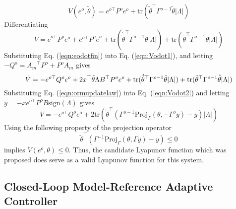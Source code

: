 \documentclass[]{../sty/aiaa-tc}
\begin{document}
  \begin{equation}
    V(e^{o},\tilde{\theta})=e^{o\top}P^{o}e^{o}+\text{tr}\left(\tilde{\theta}^{\top}\Gamma^{o-1}\tilde{\theta}|\Lambda|\right)
  \end{equation}
  Differentiating
  \begin{equation}
    \label{eqn:Vodot1}
    \dot{V}={\dot{e}}^{o\top}P^{o}e^{o}+e^{o\top}P^{o}\dot{e}^{o}+
    \text{tr}(\dot{\tilde{\theta}}^{\top}\Gamma^{o-1}\tilde{\theta}|\Lambda|)
    +\text{tr}({\tilde{\theta}}^{\top}\Gamma^{o-1}\dot{\tilde{\theta}}|\Lambda|)
  \end{equation}
  Substituting Eq. (\ref{eqn:eodotfin}) into Eq. (\ref{eqn:Vodot1}), and letting $-Q^{o}={A_{m}}^{\top}P^{o}+P^{o}A_{m}$ gives
  \begin{equation}
    \label{eqn:Vodot2}
    \dot{V}=-e^{o\top}Q^{o}e^{o}+2x^{\top}{\tilde{\theta}}\Lambda{B}^{\top}P^{o}e^{o}
    +\text{tr}(\dot{\tilde{\theta}}^{\top}\Gamma^{o-1}\tilde{\theta}|\Lambda|)
    +\text{tr}({\tilde{\theta}}^{\top}\Gamma^{o-1}\dot{\tilde{\theta}}|\Lambda|) \\
  \end{equation}
  Substituting Eq. (\ref{eqn:ormupdatelaw}) into Eq. (\ref{eqn:Vodot2}) and letting $y=-xe^{o\top}P^{o}B\text{sign}(\Lambda)$ gives
  \begin{equation}
    \dot{V}=-e^{o\top}Q^{o}e^{o}
    +2\text{tr}\left(\tilde{\theta}^{\top}\left(\Gamma^{o-1}\text{Proj}_{\Gamma}(\theta,-\Gamma^{o}y)-y\right)|\Lambda|\right)
  \end{equation}
  Using the following property of the projection operator\ \cite{lavretskywisebook}
  \begin{equation}
    \tilde{\theta}^{\top}(\Gamma^{-1}\text{Proj}_{\Gamma}(\theta,\Gamma y)-y)\leq 0
  \end{equation}
  implies $\dot{V}(e^{o},\theta)\leq 0$.
  Thus, the candidate Lyapunov function which was proposed does serve as a valid Lyapunov function for this system.

  \subsection{Closed-Loop Model-Reference Adaptive Controller}\label{sec:crmmrac}
\end{document}
